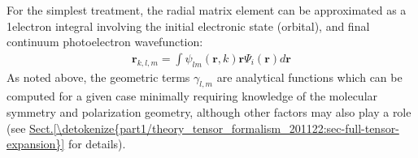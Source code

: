 \documentclass[letterpaper,table,10pt,english]{jupyterBook}
\begin{document}
\sphinxAtStartPar
For the simplest treatment, the radial matrix element can be
approximated as a 1\sphinxhyphen{}electron integral involving the initial electronic
state (orbital), and final continuum photoelectron wavefunction:
\begin{equation}\label{equation:part1/theory_photoionization_dynamics_191122:eq:r-kllam-integral}
\begin{split}\mathbf{r}_{k,l,m}=\int\psi_{lm}(\boldsymbol{r},k)\boldsymbol{r}\Psi_{i}(\boldsymbol{r})d\boldsymbol{r}
\end{split}
\end{equation}
\sphinxAtStartPar
As noted above, the geometric terms \(\gamma_{l,m}\) are analytical
functions which can be computed for a given case \sphinxhyphen{} minimally requiring
knowledge of the molecular symmetry and polarization geometry, although
other factors may also play a role (see \hyperref[\detokenize{part1/theory_tensor_formalism_201122:sec-full-tensor-expansion}]{Sect.\@ \ref{\detokenize{part1/theory_tensor_formalism_201122:sec-full-tensor-expansion}}} for details).
\end{document}
